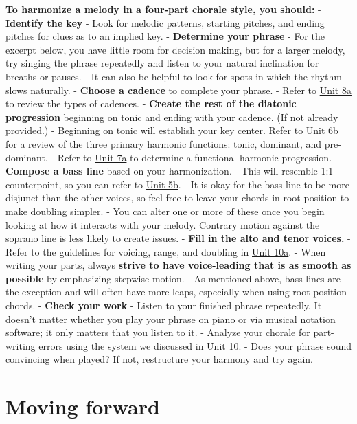 \documentclass{book}
\begin{document}
\textbf{To harmonize a melody in a four-part chorale style, you should:} -
\textbf{Identify the key} - Look for melodic patterns, starting pitches, and
ending pitches for clues as to an implied key. - \textbf{Determine your
phrase} - For the excerpt below, you have little room for decision making, but
for a larger melody, try singing the phrase repeatedly and listen to your
natural inclination for breaths or pauses. - It can also be helpful to look
for spots in which the rhythm slows naturally. - \textbf{Choose a cadence} to
complete your phrase. - Refer to
\href{08-cadences-phrasing/a1-cadences.html}{Unit 8a} to review the types of
cadences. - \textbf{Create the rest of the diatonic progression} beginning on
tonic and ending with your cadence. (If not already provided.) - Beginning on
tonic will establish your key center. Refer to
\href{06-intro-harmonic/b1-diafuncvoicelead.html}{Unit 6b} for a review of the
three primary harmonic functions: tonic, dominant, and pre-dominant. - Refer
to \href{07-harmonic-functions/a1-diaprogcirclefifths.html}{Unit 7a} to
determine a functional harmonic progression. - \textbf{Compose a bass line}
based on your harmonization. - This will resemble 1:1 counterpoint, so you can
refer to \href{05-counterpoint-embell-shapes/b1-cantfirmand1st.html}{Unit 5b}.
- It is okay for the bass line to be more disjunct than the other voices, so
feel free to leave your chords in root position to make doubling simpler. -
You can alter one or more of these once you begin looking at how it interacts
with your melody. Contrary motion against the soprano line is less likely to
create issues. - \textbf{Fill in the alto and tenor voices.} - Refer to the
guidelines for voicing, range, and doubling in
\href{10-intro-harmonic/a1-voiceleadingerrors.html}{Unit 10a}. - When writing
your parts, always \textbf{strive to have voice-leading that is as smooth as
possible} by emphasizing stepwise motion. - As mentioned above, bass lines are
the exception and will often have more leaps, especially when using
root-position chords. - \textbf{Check your work} - Listen to your finished
phrase repeatedly. It doesn't matter whether you play your phrase on piano or
via musical notation software; it only matters that you listen to it. -
Analyze your chorale for part-writing errors using the system we discussed in
Unit 10. - Does your phrase sound convincing when played? If not, restructure
your harmony and try again.

\hypertarget{moving-forward}{%
\section{Moving forward}\label{moving-forward}}
\end{document}
